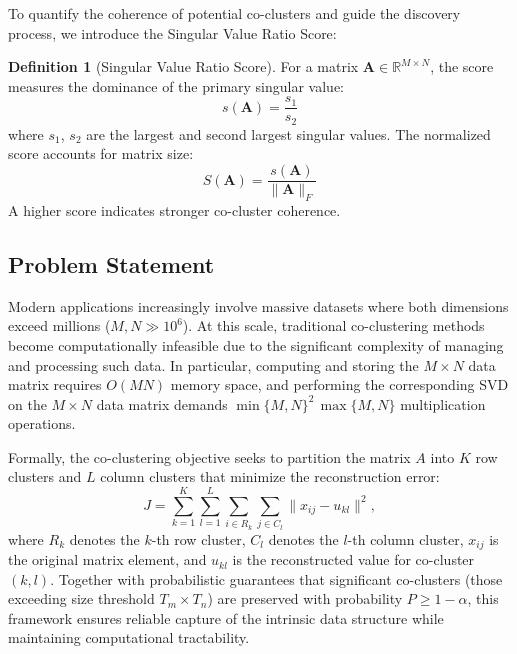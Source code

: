 \documentclass[journal]{IEEEtran}
\theoremstyle{definition}
\newtheorem{definition}{Definition}
\theoremstyle{remark} %
\begin{document}
To quantify the coherence of potential co-clusters and guide the discovery process, we introduce the Singular Value Ratio Score:

\begin{definition}[Singular Value Ratio Score]
    For a matrix $\mathbf{A} \in \mathbb{R}^{M \times N}$, the score measures the dominance of the primary singular value:
    \begin{equation}
        s(\mathbf{A}) = \frac{s_1}{s_2}
    \end{equation}
    where $s_1$, $s_2$ are the largest and second largest singular values. The normalized score accounts for matrix size:
    \begin{equation}
        S(\mathbf{A}) = \frac{s(\mathbf{A})}{\|\mathbf{A}\|_F}
    \end{equation}
    A higher score indicates stronger co-cluster coherence.
\end{definition}

\subsection{Problem Statement}
\label{subsec:problem-statement}
Modern applications increasingly involve massive datasets where both dimensions exceed millions ($M, N \gg 10^6$). At this scale, traditional co-clustering methods become computationally infeasible due to the significant complexity of managing and processing such data. {\color{blue}In particular, computing and storing the $M \times N$ data matrix requires $O(MN)$ memory space, and performing the corresponding SVD on the $M \times N$ data matrix demands $\min\{M,N\}^2\,\max\{M,N\}$ multiplication operations.}

    {\color{blue}Formally, the co-clustering objective seeks to partition the matrix $A$ into $K$ row clusters and $L$ column clusters that minimize the reconstruction error:
        \begin{equation}\label{eq:co-clustering-objective}
            J = \sum_{k=1}^{K} \sum_{l=1}^{L} \sum_{i \in R_k} \sum_{j \in C_l} \| x_{ij} - u_{kl} \|^2,
        \end{equation}
        where $R_k$ denotes the $k$-th row cluster, $C_l$ denotes the $l$-th column cluster, $x_{ij}$ is the original matrix element, and $u_{kl}$ is the reconstructed value for co-cluster $(k,l)$.}
Together with probabilistic guarantees that significant co-clusters (those exceeding size threshold $T_m \times T_n$) are preserved with probability $P \geq 1 - \alpha$, this framework ensures reliable capture of the intrinsic data structure while maintaining computational tractability.
\end{document}
